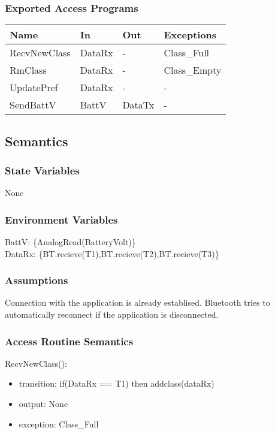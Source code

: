 \documentclass[12pt, titlepage]{article}
\begin{document}
\subsubsection{Exported Access Programs}

\begin{center}
\begin{tabular}{p{3cm} p{4cm} p{3cm} p{3cm}}
\hline
\textbf{Name} & \textbf{In} & \textbf{Out} & \textbf{Exceptions} \\
\hline
RecvNewClass & DataRx & - & Class\_Full \\
\hline
RmClass & DataRx & - & Class\_Empty \\
\hline
UpdatePref & DataRx & - & - \\
\hline
SendBattV & BattV & DataTx & - \\
\hline

\end{tabular}
\end{center}

\subsection{Semantics}

\subsubsection{State Variables}

None
\subsubsection{Environment Variables}

BattV: \{AnalogRead(BatteryVolt)\} \\
DataRx: \{BT.recieve(T1),BT.recieve(T2),BT.recieve(T3)\}

\subsubsection{Assumptions}

Connection with the application is already establised. Bluetooth tries to automatically reconnect if the application is disconnected. 

\subsubsection{Access Routine Semantics}

\noindent RecvNewClass():
\begin{itemize}
\item transition: if(DataRx == T1) then addclass(dataRx) 
\item output: None 
\item exception: Class\_Full
\end{itemize}
\end{document}

